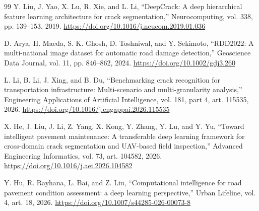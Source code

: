 \documentclass[11pt,a4paper]{article}
\begin{document}
\begin{thebibliography}{99}
 Y. Liu, J. Yao, X. Lu, R. Xie, and L. Li, ``DeepCrack: A deep hierarchical feature learning architecture for crack segmentation,'' Neurocomputing, vol. 338, pp. 139--153, 2019. \url{https://doi.org/10.1016/j.neucom.2019.01.036}

 D. Arya, H. Maeda, S. K. Ghosh, D. Toshniwal, and Y. Sekimoto, ``RDD2022: A multi-national image dataset for automatic road damage detection,'' Geoscience Data Journal, vol. 11, pp. 846--862, 2024. \url{https://doi.org/10.1002/gdj3.260}

 L. Li, B. Li, J. Xing, and B. Du, ``Benchmarking crack recognition for transportation infrastructure: Multi-scenario and multi-granularity analysis,'' Engineering Applications of Artificial Intelligence, vol. 181, part 4, art. 115535, 2026. \url{https://doi.org/10.1016/j.engappai.2026.115535}

 X. He, J. Liu, J. Li, Z. Yang, X. Kong, Y. Zhang, Y. Lu, and Y. Yu, ``Toward intelligent pavement maintenance: A transferable deep learning framework for cross-domain crack segmentation and UAV-based field inspection,'' Advanced Engineering Informatics, vol. 73, art. 104582, 2026. \url{https://doi.org/10.1016/j.aei.2026.104582}

 Y. Hu, R. Rayhana, L. Bai, and Z. Liu, ``Computational intelligence for road pavement condition assessment: a deep learning perspective,'' Urban Lifeline, vol. 4, art. 18, 2026. \url{https://doi.org/10.1007/s44285-026-00073-8}

\end{thebibliography}
\endgroup
\end{document}
